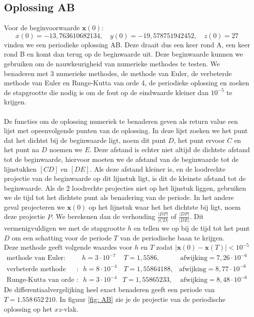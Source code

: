 \documentclass[12pt, a4paper]{article}
\theoremstyle{definition}
\begin{document}
\subsection{Oplossing AB}
Voor de beginvoorwaarde $\textbf{x}(0)$:
$$x(0) =−13,763 610 682 134, \quad y(0) =−19,578 751 942 452, \quad   z(0) = 27$$
vinden we een periodieke oplossing AB. Deze draait dus een keer rond A, een keer rond B en komt dan terug op de beginwaarde uit. Deze beginwaarde kunnen we gebruiken om de nauwkeurigheid van numerieke methodes te testen. We benaderen met 3 numerieke methodes, de methode van Euler, de verbeterde methode van Euler en Runge-Kutta van orde 4, de periodieke oplossing en zoeken de stapgrootte die nodig is om de fout op de eindwaarde kleiner dan $10^{-5}$ te krijgen.\\
\\
De functies om de oplossing numeriek te benaderen geven als return value een lijst met opeenvolgende punten van de oplossing. In deze lijst zoeken we het punt dat het dichtst bij de beginwaarde ligt, noem dit punt $D$, het punt ervoor $C$ en het punt na $D$ noemen we $E$. Deze afstand is echter niet altijd de dichtste afstand tot de beginwaarde, hiervoor moeten we de afstand van de beginwaarde tot de lijnstukken $[CD]$ en $[DE]$. Als deze afstand kleiner is, en de loodrechte projectie van de beginwaarde op dit lijnstuk ligt, is dit de kleinste afstand tot de beginwaarde. Als de 2 loodrechte projecties niet op het lijnstuk liggen, gebruiken we de tijd tot het dichtste punt als benadering van de periode. In het andere geval projecteren we $\textbf{x}(0)$ op het lijnstuk waar het het dichtste bij ligt, noem deze projectie $P$. We berekenen dan de verhouding $\frac{|DP|}{|CD|}$ of $\frac{|DP|}{|DE|}$. Dit vermenigvuldigen we met de stapgrootte $h$ en tellen we op bij de tijd tot het punt $D$ om een schatting voor de periode $T$ van de periodische baan te krijgen.\\
Deze methode geeft volgende waardes voor $h$ en $T$ zodat $|\textbf{x}(0) - \textbf{x}(T)| < 10^{-5}$
\begin{align*}
\text{methode van Euler}: & h = 3 \cdot 10^{-7} & \, T = 1,5586, &\, \text{afwijking} = 7,26 \cdot 10^{-6}\\
\text{verbeterde methode van Euler}: & \, h = 8 \cdot 10^{-4} &\, T = 1,55864188, & \text{afwijking} = 8,77 \cdot 10^{-6}\\
\text{Runge-Kutta van orde 4}: &\, h = 3 \cdot 10^{-4} & T = 1,55865233, &\, \text{afwijking} = 8,48 \cdot 10^{-6}
\end{align*}
De differentiaalvergelijking heel exact benaderen geeft een periode van $T=1.558 \, 652 \, 210$. In figuur \ref{fig: AB} zie je de projectie van de periodische oplossing op het $xz$-vlak.
\end{document}
